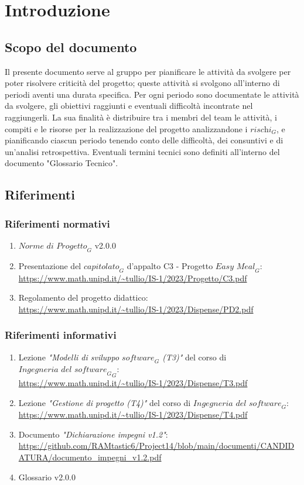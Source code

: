 \section{Introduzione}
\subsection{Scopo del documento}
Il presente documento serve al gruppo per pianificare le attività da svolgere per poter risolvere criticità del progetto; queste attività si svolgono all'interno di periodi aventi una durata specifica.
Per ogni periodo sono documentate le attività da svolgere, gli obiettivi raggiunti e eventuali difficoltà incontrate nel raggiungerli. La sua finalità è distribuire tra i membri del team le attività, i compiti e le risorse per la realizzazione del progetto analizzandone i $\textit{rischi}_G$, e pianificando ciascun periodo tenendo conto delle difficoltà, dei consuntivi e di un'analisi retrospettiva. Eventuali termini tecnici sono definiti all'interno del documento "Glossario Tecnico".
\subsection{Riferimenti}
\subsubsection{Riferimenti normativi}
\begin{enumerate}
    \item $\textit{Norme di Progetto}_G$ v2.0.0
    \item Presentazione del $\textit{capitolato}_G$ d'appalto C3 - Progetto $\textit{Easy Meal}_G$: \\ \url{https://www.math.unipd.it/~tullio/IS-1/2023/Progetto/C3.pdf}
    \item Regolamento del progetto didattico: \\ 
    \url{https://www.math.unipd.it/~tullio/IS-1/2023/Dispense/PD2.pdf}
\end{enumerate}
\subsubsection{Riferimenti informativi}
\label{sec:rif_inf}
\begin{enumerate}
    \item Lezione \emph{"Modelli di sviluppo $\textit{software}_G$ (T3)"} del corso di $\textit{Ingegneria del $\textit{software}_G$}_G$: \\
    \url{https://www.math.unipd.it/~tullio/IS-1/2023/Dispense/T3.pdf}
    \item Lezione \emph{"Gestione di progetto (T4)"} del corso di $\textit{Ingegneria del software}_G$: \\
    \url{https://www.math.unipd.it/~tullio/IS-1/2023/Dispense/T4.pdf}
    \item Documento \emph{"Dichiarazione impegni v1.2"}: \\
    \url{https://github.com/RAMtastic6/Project14/blob/main/documenti/CANDIDATURA/documento_impegni_v1.2.pdf}
    \item Glossario v2.0.0
    
\end{enumerate}

